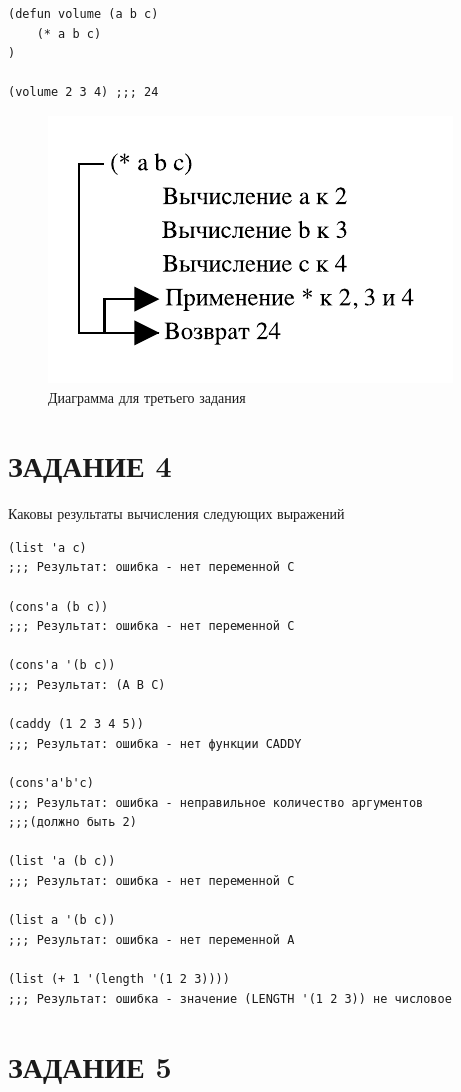 \begin{lstlisting}
(defun volume (a b c)
    (* a b c)
)

(volume 2 3 4) ;;; 24
\end{lstlisting}

\begin{figure}[H]
    \centering
    \includegraphics{img/03.pdf}
    \caption{Диаграмма для третьего задания}
\end{figure}

\chapter{ЗАДАНИЕ 4}

Каковы результаты вычисления следующих выражений

\begin{lstlisting}
(list 'a c)
;;; Результат: ошибка - нет переменной C

(cons'a (b c))
;;; Результат: ошибка - нет переменной C

(cons'a '(b c))
;;; Результат: (A B C)

(caddy (1 2 3 4 5))
;;; Результат: ошибка - нет функции CADDY

(cons'a'b'c)
;;; Результат: ошибка - неправильное количество аргументов
;;;(должно быть 2)

(list 'a (b c))
;;; Результат: ошибка - нет переменной C

(list a '(b c))
;;; Результат: ошибка - нет переменной A

(list (+ 1 '(length '(1 2 3))))
;;; Результат: ошибка - значение (LENGTH '(1 2 3)) не числовое
\end{lstlisting}

\chapter{ЗАДАНИЕ 5}

